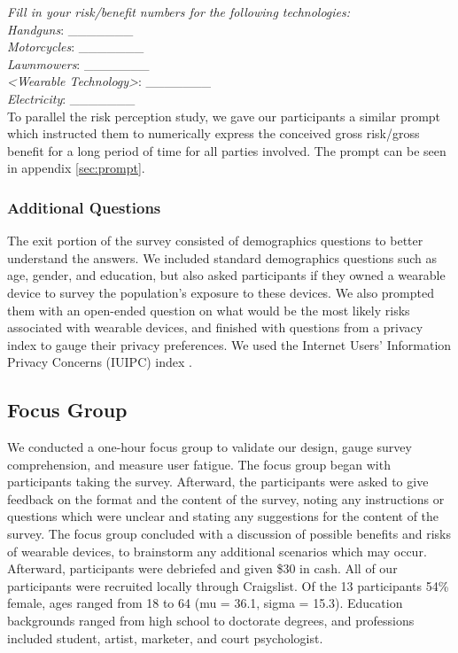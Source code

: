 \documentclass{acm_proc_article-sp}
\begin{document}
\textit{Fill in your risk/benefit numbers for the following technologies:}\\[-.5cm]

\textit{Handguns}: \_\_\_\_\_\_\_ \\
\textit{Motorcycles}: \_\_\_\_\_\_\_\\
\textit{Lawnmowers}: \_\_\_\_\_\_\_\\
\textit{<Wearable Technology>}: \_\_\_\_\_\_\_\\
\textit{Electricity}: \_\_\_\_\_\_\_\\ [-.5cm]

To parallel the risk perception study, we gave our participants a similar prompt which instructed them to numerically express the conceived gross risk/gross benefit for a long period of time for all parties involved. The prompt can be seen in appendix \ref{sec:prompt}. 

\subsubsection{Additional Questions}
The exit portion of the survey consisted of demographics questions to better understand the answers. We included standard demographics questions such as age, gender, and education, but also asked participants if they owned a wearable device to survey the population's exposure to these devices. We also prompted them with an open-ended question on what would be the most likely risks associated with wearable devices, and finished with questions from a privacy index to gauge their privacy preferences. We used the Internet Users' Information Privacy Concerns (IUIPC) index \cite{malhotra2004internet}.

\subsection{Focus Group}
We conducted a one-hour focus group to validate our design, gauge survey comprehension, and measure user fatigue. The focus group began with participants taking the survey. Afterward, the participants were asked to give feedback on the format and the content of the survey, noting any instructions or questions which were unclear and stating any suggestions for the content of the survey. The focus group concluded with a discussion of possible benefits and risks of wearable devices, to brainstorm any additional scenarios which may occur. Afterward, participants were debriefed and given \$30 in cash. All of our participants were recruited locally through Craigslist. Of the 13 participants 54\% female, ages ranged from 18 to 64 (mu = 36.1, sigma = 15.3).  Education backgrounds ranged from high school to doctorate degrees, and professions included student, artist, marketer, and court psychologist.
\end{document}
